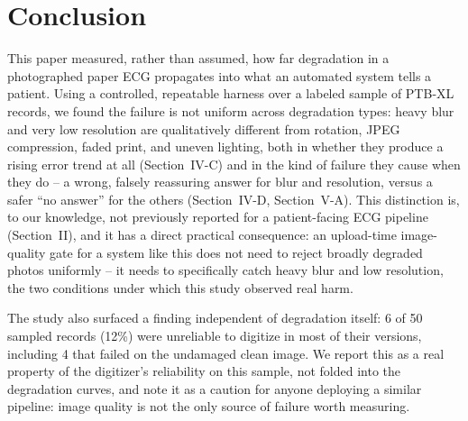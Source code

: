 \documentclass[conference]{IEEEtran}
\begin{document}
\section{Conclusion}

This paper measured, rather than assumed, how far degradation in a photographed
paper ECG propagates into what an automated system tells a patient. Using a
controlled, repeatable harness over a labeled sample of PTB-XL records, we found the
failure is not uniform across degradation types: heavy blur and very low resolution
are qualitatively different from rotation, JPEG compression, faded print, and uneven
lighting, both in whether they produce a rising error trend at all (Section~IV-C) and
in the kind of failure they cause when they do -- a wrong, falsely reassuring answer
for blur and resolution, versus a safer ``no answer'' for the others (Section~IV-D,
Section~V-A). This distinction is, to our knowledge, not previously reported for a
patient-facing ECG pipeline (Section~II), and it has a direct practical consequence:
an upload-time image-quality gate for a system like this does not need to reject
broadly degraded photos uniformly -- it needs to specifically catch heavy blur and
low resolution, the two conditions under which this study observed real harm.

The study also surfaced a finding independent of degradation itself: 6 of 50 sampled
records (12\%) were unreliable to digitize in most of their versions, including 4
that failed on the undamaged clean image. We report this as a real property of the
digitizer's reliability on this sample, not folded into the degradation curves, and
note it as a caution for anyone deploying a similar pipeline: image quality is not
the only source of failure worth measuring.
\end{document}
